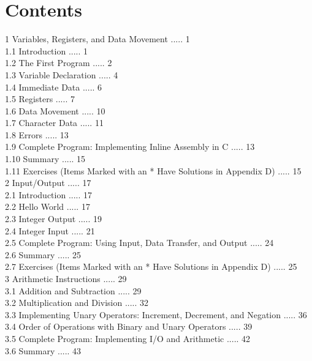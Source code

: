 \documentclass[10pt]{book}
\begin{document}
\section*{Contents}
1 Variables, Registers, and Data Movement ..... 1\\
1.1 Introduction ..... 1\\
1.2 The First Program ..... 2\\
1.3 Variable Declaration ..... 4\\
1.4 Immediate Data ..... 6\\
1.5 Registers ..... 7\\
1.6 Data Movement ..... 10\\
1.7 Character Data ..... 11\\
1.8 Errors ..... 13\\
1.9 Complete Program: Implementing Inline Assembly in C ..... 13\\
1.10 Summary ..... 15\\
1.11 Exercises (Items Marked with an * Have Solutions in Appendix D) ..... 15\\
2 Input/Output ..... 17\\
2.1 Introduction ..... 17\\
2.2 Hello World ..... 17\\
2.3 Integer Output ..... 19\\
2.4 Integer Input ..... 21\\
2.5 Complete Program: Using Input, Data Transfer, and Output ..... 24\\
2.6 Summary ..... 25\\
2.7 Exercises (Items Marked with an * Have Solutions in Appendix D) ..... 25\\
3 Arithmetic Instructions ..... 29\\
3.1 Addition and Subtraction ..... 29\\
3.2 Multiplication and Division ..... 32\\
3.3 Implementing Unary Operators: Increment, Decrement, and Negation ..... 36\\
3.4 Order of Operations with Binary and Unary Operators ..... 39\\
3.5 Complete Program: Implementing I/O and Arithmetic ..... 42\\
3.6 Summary ..... 43\\
\end{document}

